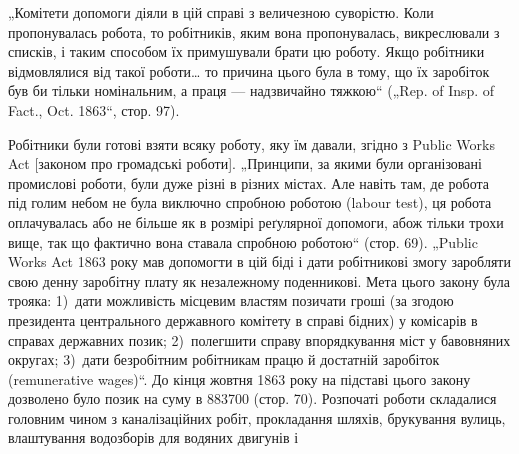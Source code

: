 „Комітети допомоги діяли в цій справі з величезною суворістю.
Коли пропонувалась робота, то робітників, яким вона пропонувалась,
викреслювали з списків, і таким способом їх примушували
брати цю роботу. Якщо робітники відмовлялися від такої роботи\dots{}
то причина цього була в тому, що їх заробіток був би тільки
номінальним, а праця — надзвичайно тяжкою“ („Rep. of Insp. of
Fact., Oct. 1863“, стор. 97).

Робітники були готові взяти всяку роботу, яку їм давали,
згідно з Public Works Act [законом про громадські роботи].
„Принципи, за якими були організовані промислові роботи, були
дуже різні в різних містах. Але навіть там, де робота під голим
небом не була виключно спробною роботою (labour test), ця
робота оплачувалась або не більше як в розмірі реґулярної
допомоги, абож тільки трохи вище, так що фактично вона ставала
спробною роботою“ (стор. 69). „Public Works Act 1863 року
мав допомогти в цій біді і дати робітникові змогу заробляти свою
денну заробітну плату як незалежному поденникові. Мета цього
закону була трояка: 1)~дати можливість місцевим властям позичати
гроші (за згодою президента центрального державного
комітету в справі бідних) у комісарів в справах державних позик;
2)~полегшити справу впорядкування міст у бавовняних округах;
3)~дати безробітним робітникам працю й достатній заробіток
(remunerative wages)“. До кінця жовтня 1863 року на підставі
цього закону дозволено було позик на суму в \num{883700} (стор. 70). Розпочаті роботи складалися головним
чином з каналізаційних робіт, прокладання шляхів, брукування
вулиць, влаштування водозборів для водяних двигунів і~

